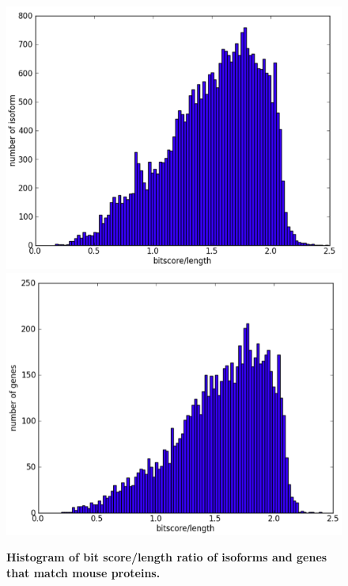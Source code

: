 \documentclass[10pt]{article}
\begin{document}
\begin{figure}[!ht]
\begin{center}
\includegraphics[width=5in]{figure14.png}
\includegraphics[width=5in]{figure15.png}
\end{center}
\caption{
{\bf Histogram of bit score/length ratio of isoforms and genes that match mouse proteins.}
}
\label{figure14}
\end{figure}
\end{document}
